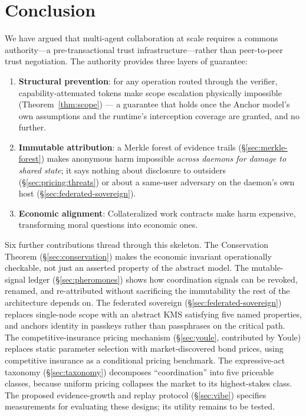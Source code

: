 \documentclass[11pt,a4paper]{article}
\theoremstyle{definition}
\theoremstyle{remark}
\begin{document}
\section{Conclusion}

We have argued that multi-agent collaboration at scale requires a commons authority---a pre-transactional trust infrastructure---rather than peer-to-peer trust negotiation. The authority provides three layers of guarantee:

\begin{enumerate}[nosep]
  \item \textbf{Structural prevention}: for any operation routed through the verifier, capability-attenuated tokens make scope escalation physically impossible (Theorem~\ref{thm:scope}) --- a guarantee that holds once the Anchor model's own assumptions and the runtime's interception coverage are granted, and no further.
  \item \textbf{Immutable attribution}: a Merkle forest of evidence trails (\S\ref{sec:merkle-forest}) makes anonymous harm impossible \emph{across daemons for damage to shared state}; it says nothing about disclosure to outsiders (\S\ref{sec:pricing:threats}) or about a same-user adversary on the daemon's own host (\S\ref{sec:federated-sovereign}).
  \item \textbf{Economic alignment}: Collateralized work contracts make harm expensive, transforming moral questions into economic ones.
\end{enumerate}

Six further contributions thread through this skeleton. The Conservation Theorem (\S\ref{sec:conservation}) makes the economic invariant operationally checkable, not just an asserted property of the abstract model. The mutable-signal ledger (\S\ref{sec:pheromones}) shows how coordination signals can be revoked, renamed, and re-attributed without sacrificing the immutability the rest of the architecture depends on. The federated sovereign (\S\ref{sec:federated-sovereign}) replaces single-node scope with an abstract KMS satisfying five named properties, and anchors identity in passkeys rather than passphrases on the critical path. The competitive-insurance pricing mechanism (\S\ref{sec:youle}, contributed by Youle) replaces static parameter selection with market-discovered bond prices, using competitive insurance as a conditional pricing benchmark. The expressive-act taxonomy (\S\ref{sec:taxonomy}) decomposes ``coordination'' into five priceable classes, because uniform pricing collapses the market to its highest-stakes class. The proposed evidence-growth and replay protocol (\S\ref{sec:vibe}) specifies measurements for evaluating these designs; its utility remains to be tested.
\end{document}
